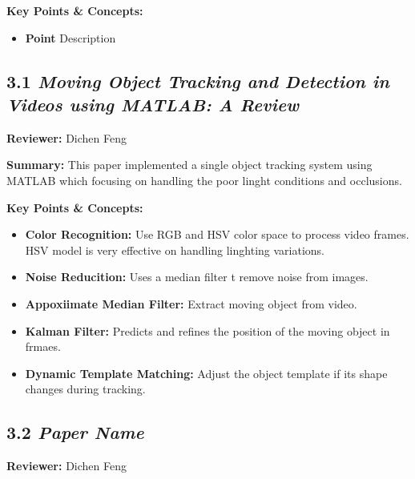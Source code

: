 \documentclass{article}
\begin{document}
\vspace{0.3cm}

\textbf{Key Points \& Concepts:}
\begin{itemize}
  \item \textbf{Point} Description
\end{itemize}

\subsection*{3.1 \textit{Moving Object Tracking and Detection in Videos using MATLAB: A Review}}

\hspace*{\parindent}\textbf{Reviewer:} Dichen Feng

\vspace{0.3cm}

\textbf{Summary:} This paper implemented a single object tracking system using MATLAB which focusing on handling the poor linght conditions and occlusions.

\vspace{0.3cm}

\textbf{Key Points \& Concepts:}
\begin{itemize}
  \item \textbf{Color Recognition:} Use RGB and HSV color space to process video frames. HSV model is very effective on handling linghting variations.
  \item \textbf{Noise Reducition:} Uses a median filter t remove noise from images.
  \item \textbf{Appoxiimate Median Filter:} Extract moving object from video.
  \item \textbf{Kalman Filter:} Predicts and refines the position of the moving object in frmaes.
  \item \textbf{Dynamic Template Matching:} Adjust the object template if its shape changes during tracking.
\end{itemize}

\subsection*{3.2 \textit{Paper Name}}

\hspace*{\parindent}\textbf{Reviewer:} Dichen Feng
\end{document}

